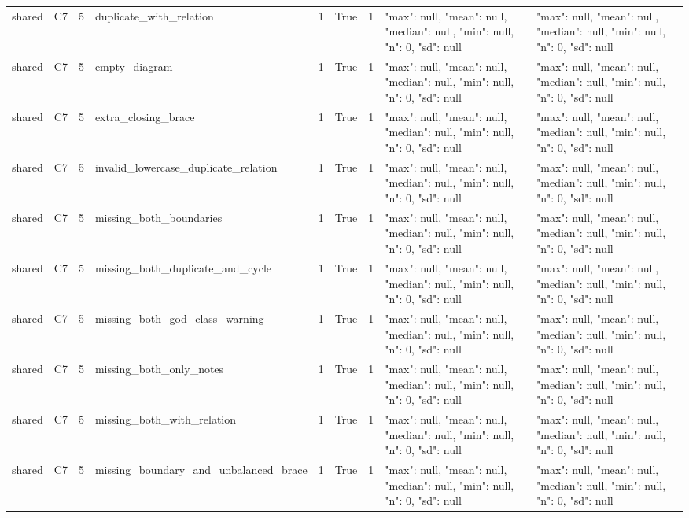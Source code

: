 \begin{tabular}{lllllllll}
shared & C7 & 5 & duplicate\_with\_relation & 1 & True & 1 & {"max": null, "mean": null, "median": null, "min": null, "n": 0, "sd": null} & {"max": null, "mean": null, "median": null, "min": null, "n": 0, "sd": null} \\
shared & C7 & 5 & empty\_diagram & 1 & True & 1 & {"max": null, "mean": null, "median": null, "min": null, "n": 0, "sd": null} & {"max": null, "mean": null, "median": null, "min": null, "n": 0, "sd": null} \\
shared & C7 & 5 & extra\_closing\_brace & 1 & True & 1 & {"max": null, "mean": null, "median": null, "min": null, "n": 0, "sd": null} & {"max": null, "mean": null, "median": null, "min": null, "n": 0, "sd": null} \\
shared & C7 & 5 & invalid\_lowercase\_duplicate\_relation & 1 & True & 1 & {"max": null, "mean": null, "median": null, "min": null, "n": 0, "sd": null} & {"max": null, "mean": null, "median": null, "min": null, "n": 0, "sd": null} \\
shared & C7 & 5 & missing\_both\_boundaries & 1 & True & 1 & {"max": null, "mean": null, "median": null, "min": null, "n": 0, "sd": null} & {"max": null, "mean": null, "median": null, "min": null, "n": 0, "sd": null} \\
shared & C7 & 5 & missing\_both\_duplicate\_and\_cycle & 1 & True & 1 & {"max": null, "mean": null, "median": null, "min": null, "n": 0, "sd": null} & {"max": null, "mean": null, "median": null, "min": null, "n": 0, "sd": null} \\
shared & C7 & 5 & missing\_both\_god\_class\_warning & 1 & True & 1 & {"max": null, "mean": null, "median": null, "min": null, "n": 0, "sd": null} & {"max": null, "mean": null, "median": null, "min": null, "n": 0, "sd": null} \\
shared & C7 & 5 & missing\_both\_only\_notes & 1 & True & 1 & {"max": null, "mean": null, "median": null, "min": null, "n": 0, "sd": null} & {"max": null, "mean": null, "median": null, "min": null, "n": 0, "sd": null} \\
shared & C7 & 5 & missing\_both\_with\_relation & 1 & True & 1 & {"max": null, "mean": null, "median": null, "min": null, "n": 0, "sd": null} & {"max": null, "mean": null, "median": null, "min": null, "n": 0, "sd": null} \\
shared & C7 & 5 & missing\_boundary\_and\_unbalanced\_brace & 1 & True & 1 & {"max": null, "mean": null, "median": null, "min": null, "n": 0, "sd": null} & {"max": null, "mean": null, "median": null, "min": null, "n": 0, "sd": null} \\

\end{tabular}
